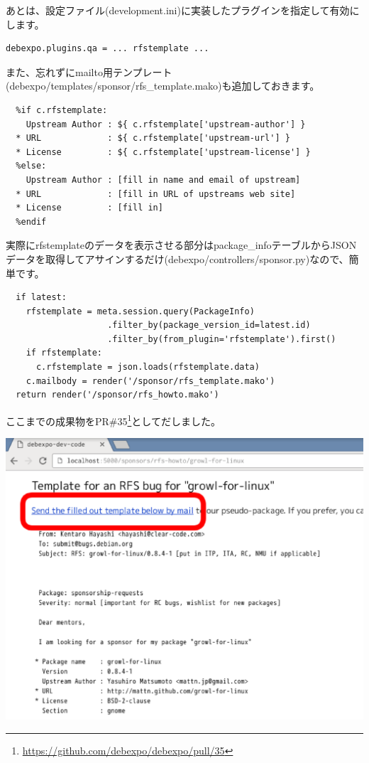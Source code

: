 \documentclass[mingoth,a4paper]{jsarticle}
\begin{document}
あとは、設定ファイル(development.ini)に実装したプラグインを指定して有効にします。

\begin{screen}
\begin{verbatim}
debexpo.plugins.qa = ... rfstemplate ...
\end{verbatim}
\end{screen}

また、忘れずにmailto用テンプレート(debexpo/templates/sponsor/rfs\_template.mako)も追加しておきます。

\begin{screen}
\begin{verbatim}
  %if c.rfstemplate:
    Upstream Author : ${ c.rfstemplate['upstream-author'] }
  * URL             : ${ c.rfstemplate['upstream-url'] }
  * License         : ${ c.rfstemplate['upstream-license'] }
  %else:
    Upstream Author : [fill in name and email of upstream]
  * URL             : [fill in URL of upstreams web site]
  * License         : [fill in]
  %endif
\end{verbatim}
\end{screen}

実際にrfstemplateのデータを表示させる部分はpackage\_infoテーブルからJSONデータを取得してアサインするだけ(debexpo/controllers/sponsor.py)なので、簡単です。

\begin{screen}
\begin{verbatim}
  if latest:
    rfstemplate = meta.session.query(PackageInfo)
                    .filter_by(package_version_id=latest.id)
                    .filter_by(from_plugin='rfstemplate').first()
    if rfstemplate:
      c.rfstemplate = json.loads(rfstemplate.data)
    c.mailbody = render('/sponsor/rfs_template.mako')
  return render('/sponsor/rfs_howto.mako')
\end{verbatim}
\end{screen}

ここまでの成果物をPR\#35\footnote{\url{https://github.com/debexpo/debexpo/pull/35}}としてだしました。

\begin{screen}
\includegraphics[width=0.7\hsize]{image201606/debexpo-pr35-take2.eps}
\end{screen}
\end{document}
